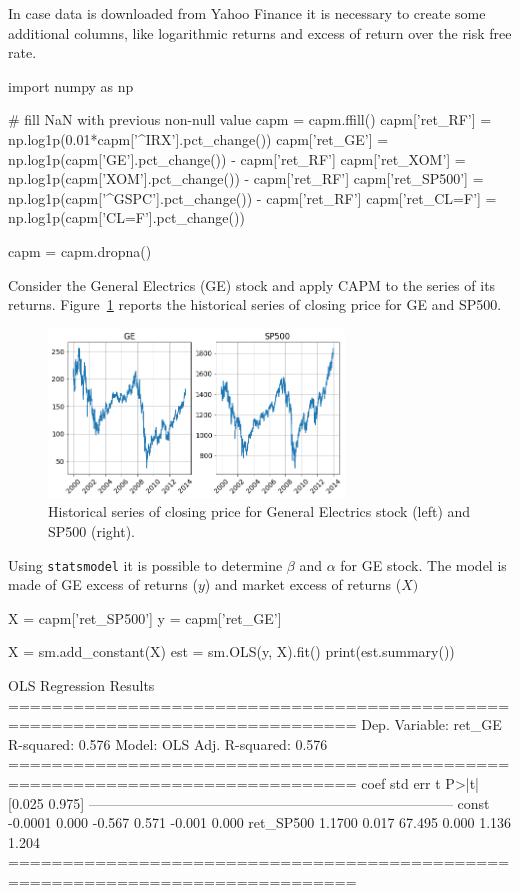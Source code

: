 In case data is downloaded from Yahoo Finance it is necessary to create some additional columns, like logarithmic returns and excess of return over the risk free rate.

\begin{ipython}
import numpy as np

# fill NaN with previous non-null value
capm = capm.ffill()
capm['ret_RF'] = np.log1p(0.01*capm['^IRX'].pct_change())
capm['ret_GE'] = np.log1p(capm['GE'].pct_change()) - capm['ret_RF']
capm['ret_XOM'] = np.log1p(capm['XOM'].pct_change()) - capm['ret_RF']
capm['ret_SP500'] = np.log1p(capm['^GSPC'].pct_change()) - capm['ret_RF']
capm['ret_CL=F'] = np.log1p(capm['CL=F'].pct_change())

capm = capm.dropna()
\end{ipython}

Consider the General Electrics (GE) stock and apply CAPM to the series of its returns. Figure~\ref{fig:ge_returns} reports the historical series of closing price for GE and SP500.

\begin{figure}[htbp]
\centering
\includegraphics[width=0.7\textwidth]{figures/capm_ge}
\caption{Historical series of closing price for General Electrics stock (left) and SP500 (right).}
\label{fig:ge_returns}
\end{figure}
 
Using \texttt{statsmodel} it is possible to determine $\beta$ and $\alpha$ for GE stock. The model is made of GE excess of returns ($y$) and market excess of returns ($X)$ 

\begin{ipython}
X = capm['ret_SP500']
y = capm['ret_GE']

X = sm.add_constant(X)
est = sm.OLS(y, X).fit()
print(est.summary())
\end{ipython}
\begin{ioutput}
                            OLS Regression Results                            
==============================================================================
Dep. Variable:                 ret_GE   R-squared:                       0.576
Model:                            OLS   Adj. R-squared:                  0.576
==============================================================================
                 coef    std err          t      P>|t|      [0.025      0.975]
------------------------------------------------------------------------------
const         -0.0001      0.000     -0.567      0.571      -0.001       0.000
ret_SP500      1.1700      0.017     67.495      0.000       1.136       1.204
==============================================================================
\end{ioutput}


